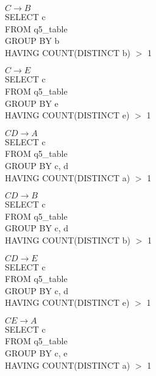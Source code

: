 \documentclass[a4paper,12pt]{article}
\begin{document}
\begin{tcolorbox}
$C \to B$ \\

SELECT c\\
FROM q5\_table\\ 
GROUP BY b\\
HAVING COUNT(DISTINCT b) $>$ 1 \\
\end{tcolorbox}

\begin{tcolorbox}
$C \to E$ \\

SELECT c\\
FROM q5\_table\\ 
GROUP BY e\\
HAVING COUNT(DISTINCT e) $>$ 1 \\
\end{tcolorbox}

\begin{tcolorbox}
$CD \to A$ \\

SELECT c\\
FROM q5\_table\\ 
GROUP BY c, d\\
HAVING COUNT(DISTINCT a) $>$ 1 \\
\end{tcolorbox}

\begin{tcolorbox}
$CD \to B$ \\

SELECT c\\
FROM q5\_table\\ 
GROUP BY c, d\\
HAVING COUNT(DISTINCT b) $>$ 1 \\
\end{tcolorbox}

\begin{tcolorbox}
$CD \to E$ \\

SELECT c\\
FROM q5\_table\\ 
GROUP BY c, d\\
HAVING COUNT(DISTINCT e) $>$ 1 \\
\end{tcolorbox}

\begin{tcolorbox}
$CE \to A$ \\

SELECT c\\
FROM q5\_table\\ 
GROUP BY c, e\\
HAVING COUNT(DISTINCT a) $>$ 1 \\
\end{tcolorbox}
\end{document}
